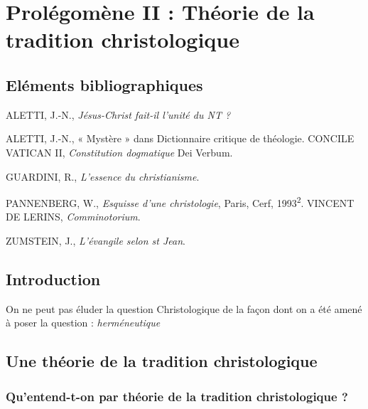 \hypertarget{christologies-et-cultures-dans-lhistoire-2-proluxe9gomuxe8nes-ii}{%
\chapter{Prolégomène II : Théorie de la tradition christologique}\label{christologies-et-cultures-dans-lhistoire-2-proluxe9gomuxe8nes-ii}}





\hypertarget{eluxe9ments-bibliographiques}{%
\section{Eléments bibliographiques}\label{eluxe9ments-bibliographiques}}


ALETTI, J.-N., \emph{Jésus-Christ fait-il l'unité du NT ?}

ALETTI, J.-N., « Mystère » dans Dictionnaire critique de théologie.
CONCILE VATICAN II, \emph{Constitution dogmatique} Dei Verbum.

GUARDINI, R., \emph{L'essence du christianisme}.

PANNENBERG, W., \emph{Esquisse d'une christologie}, Paris, Cerf,
1993\textsuperscript{2}. VINCENT DE LERINS, \emph{Comminotorium}.

ZUMSTEIN, J., \emph{L'évangile selon st Jean}.



\section{Introduction} 




  On ne peut pas éluder la question Christologique de la façon dont on a été amené à poser la question : \textit{herméneutique}
  \section{Une théorie de la tradition christologique}
  

    \subsection{Qu'entend-t-on par théorie de la tradition christologique ?}
    

